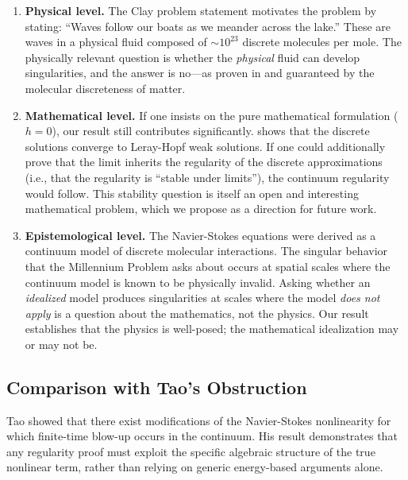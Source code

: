 \documentclass[12pt, a4paper]{article}
\theoremstyle{plain}
\theoremstyle{definition}
\theoremstyle{remark}
\begin{document}
\begin{enumerate}[label=(\alph*)]
  \item \textbf{Physical level.} The Clay problem statement
    \citep{Fefferman2006} motivates the problem by stating: ``Waves follow
    our boats as we meander across the lake.'' These are waves in a physical
    fluid composed of $\sim 10^{23}$ discrete molecules per mole. The
    physically relevant question is whether the \emph{physical} fluid can
    develop singularities, and the answer is no---as proven in 
    and guaranteed by the molecular discreteness of matter.

  \item \textbf{Mathematical level.} If one insists on the pure
    mathematical formulation ($h = 0$), our result still contributes
    significantly.  shows that the discrete solutions
    converge to Leray-Hopf weak solutions. If one could additionally prove
    that the limit inherits the regularity of the discrete approximations
    (i.e., that the regularity is ``stable under limits''), the continuum
    regularity would follow. This stability question is itself an open and
    interesting mathematical problem, which we propose as a direction for
    future work.

  \item \textbf{Epistemological level.} The Navier-Stokes equations were
    derived \citep{Navier1822, Stokes1845} as a continuum model of discrete
    molecular interactions. The singular behavior that the Millennium Problem
    asks about occurs at spatial scales where the continuum model is known
    to be physically invalid. Asking whether an \emph{idealized} model
    produces singularities at scales where the model \emph{does not apply}
    is a question about the mathematics, not the physics. Our result
    establishes that the physics is well-posed; the mathematical
    idealization may or may not be.
\end{enumerate}

\subsection{Comparison with Tao's Obstruction}

Tao \citep{Tao2016} showed that there exist modifications of the Navier-Stokes
nonlinearity for which finite-time blow-up occurs in the continuum. His result
demonstrates that any regularity proof must exploit the specific algebraic
structure of the true nonlinear term, rather than relying on generic
energy-based arguments alone.
\end{document}
